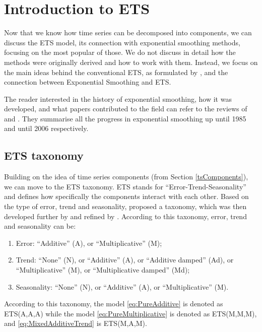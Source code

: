 \documentclass[
]{book}
\providecommand{\tightlist}{%
  \setlength{\itemsep}{0pt}\setlength{\parskip}{0pt}}
\theoremstyle{definition}
\theoremstyle{definition}
\theoremstyle{definition}
\theoremstyle{definition}
\theoremstyle{remark}
\begin{document}
\hypertarget{ETSConventional}{%
\chapter{Introduction to ETS}\label{ETSConventional}}

Now that we know how time series can be decomposed into components, we can discuss the ETS model, its connection with exponential smoothing methods, focusing on the most popular of those. We do not discuss in detail how the methods were originally derived and how to work with them. Instead, we focus on the main ideas behind the conventional ETS, as formulated by \citet{Hyndman2008b}, and the connection between Exponential Smoothing and ETS.

The reader interested in the history of exponential smoothing, how it was developed, and what papers contributed to the field can refer to the reviews of \citet{Gardner1985} and \citet{Gardner2006}. They summarise all the progress in exponential smoothing up until 1985 and until 2006 respectively.

\hypertarget{ETSTaxonomy}{%
\section{ETS taxonomy}\label{ETSTaxonomy}}

Building on the idea of time series components (from Section \ref{tsComponents}), we can move to the ETS taxonomy. ETS stands for ``Error-Trend-Seasonality'' and defines how specifically the components interact with each other. Based on the type of error, trend and seasonality, \citet{Pegels1969} proposed a taxonomy, which was then developed further by \citet{Hyndman2002} and refined by \citet{Hyndman2008b}. According to this taxonomy, error, trend and seasonality can be:

\begin{enumerate}
\def\labelenumi{\arabic{enumi}.}
\tightlist
\item
  Error: ``Additive'' (A), or ``Multiplicative'' (M);
\item
  Trend: ``None'' (N), or ``Additive'' (A), or ``Additive damped'' (Ad), or ``Multiplicative'' (M), or ``Multiplicative damped'' (Md);
\item
  Seasonality: ``None'' (N), or ``Additive'' (A), or ``Multiplicative'' (M).
\end{enumerate}

According to this taxonomy, the model \eqref{eq:PureAdditive} is denoted as ETS(A,A,A) while the model \eqref{eq:PureMultiplicative} is denoted as ETS(M,M,M), and \eqref{eq:MixedAdditiveTrend} is ETS(M,A,M).
\end{document}

